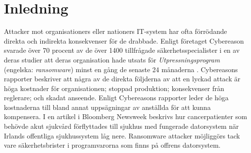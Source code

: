 \section{Inledning}
Attacker mot organisationers eller nationers IT-system har ofta förrödande
direkta och indirekta konsekvenser för de drabbade. Enligt företaget Cybereason
svarade över 70 procent av de över 1400 tillfrågade säkerhetsspecialister i en
av deras studier att deras organisation hade utsats för
\emph{Utpressningsprogram} (engelska: \emph{ransomware}) minst en gång de senaste
24 månaderna \cite{cyberreason2021, cyberreason2022}. Cybereasons rapporter
beskriver att några av de direkta följderna av att en lyckad attack är höga
kostnader för organisationen; stoppad produktion; konsekvenser från reglerare;
och skadat anseende. Enligt Cybereasons rapporter leder de höga kostnaderna till
bland annat uppsägningar av anställda för att kunna kompensera. I en artikel i
Bloomberg Newsweek \cite{gallagher2023} beskrivs hur cancerpatienter som behövde
akut sjukvård förflyttades till sjukhus med fungerade datorsystem när Irlands
offentliga sjukhussystem låg nere. \cite{hse_report} Ransomware attacker
möjliggörs tack vare säkerhetsbrister i programvarorna som finns på offrens
datorsystem.




